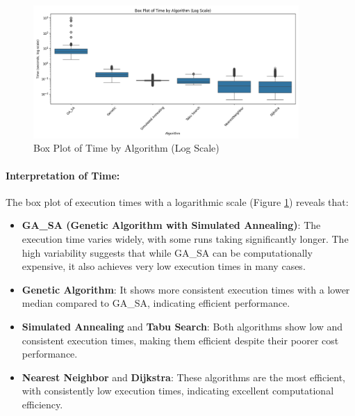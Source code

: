 \documentclass{article}
\begin{document}
    \begin{figure}[h!]
        \centering
        \includegraphics[width=0.9\textwidth]{algo_summary/boxplot_time_log_scale}
        \caption{Box Plot of Time by Algorithm (Log Scale)}
        \label{fig:boxplot_time_log_scale}
    \end{figure}

    \paragraph{Interpretation of Time:}
    The box plot of execution times with a logarithmic scale (Figure \ref{fig:boxplot_time_log_scale}) reveals that:
    \begin{itemize}
        \item \textbf{GA\_SA (Genetic Algorithm with Simulated Annealing)}: The execution time varies widely, with some runs taking significantly longer. The high variability suggests that while GA\_SA can be computationally expensive, it also achieves very low execution times in many cases.
        \item \textbf{Genetic Algorithm}: It shows more consistent execution times with a lower median compared to GA\_SA, indicating efficient performance.
        \item \textbf{Simulated Annealing} and \textbf{Tabu Search}: Both algorithms show low and consistent execution times, making them efficient despite their poorer cost performance.
        \item \textbf{Nearest Neighbor} and \textbf{Dijkstra}: These algorithms are the most efficient, with consistently low execution times, indicating excellent computational efficiency.
    \end{itemize}
\end{document}
